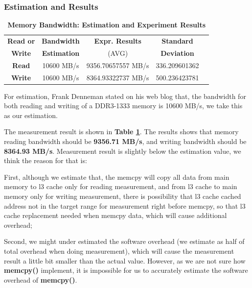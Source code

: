 \subsubsection{Estimation and Results}
\label{Memory_bandwidth_result_section}

\begin{table}[ht]
  \centering
  \caption{\textbf{Memory Bandwidth: Estimation and Experiment Results}}
  \begin{threeparttable}
  \begin{tabular}{ccccc}
  \hline
      \textbf{Read or} & \textbf{Bandwidth}   & \textbf{Expr. Results} & \textbf{Standard}\\
      \textbf{Write}   & \textbf{Estimation}  & (AVG)   & \textbf{Deviation} \\
  \hline
      \textbf{Read}  & 10600 MB/s & 9356.70657557 MB/s & 336.209601362  \\
      \textbf{Write} & 10600 MB/s & 8364.93322737 MB/s & 500.236423781  \\
  \hline
  \end{tabular}
  \end{threeparttable}
  \label{memory_bandwidth_table}
\end{table}

For estimation, Frank Denneman stated on his web blog \cite{frankdenneman} that, the bandwidth for both reading and writing of a DDR3-1333 memory is 10600 MB/s, we take this as our estimation.

The measurement result is shown in \textbf{Table \ref{memory_bandwidth_table}}. The results shows that memory reading bandwidth should be \textbf{9356.71 MB/s}, and writing bandwidth should be \textbf{8364.93 MB/s}. Measurement result is slightly below the estimation value, we think the reason for that is:

First, although we estimate that, the memcpy will copy all data from main memory to l3 cache only for reading measurement, and from l3 cache to main memory only for writing measurement, there is possibility that l3 cache cached address not in the target range for measurement right before memcpy, so that l3 cache replacement needed when memcpy data, which will cause additional overhead;

Second, we might under estimated the software overhead (we estimate as half of total overhead when doing measurement), which will cause the measurement result a little bit smaller than the actual value. However, as we are not sure how \textbf{memcpy()} implement, it is impossible for us to accurately estimate the software overhead of \textbf{memcpy()}.

